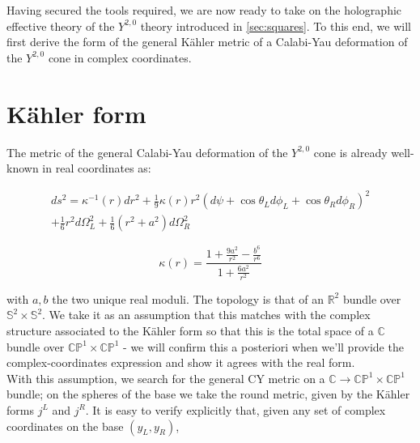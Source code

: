 %
%
%
\graphicspath{{images/}}
%

\label{chap:y20}

%

Having secured the tools required, we are now ready to take on the holographic effective theory of the $Y^{2,0}$ theory introduced in \ref{sec:squares}. To this end, we will first derive the form of the general K\"ahler metric of a Calabi-Yau deformation of the $Y^{2,0}$ cone in complex coordinates.

\section{K\"ahler form}

The metric of the general Calabi-Yau deformation of the $Y^{2,0}$ cone is already well-known in real coordinates as:

\begin{multline}
ds^2 = \kappa^{-1}(r)dr^2 + \frac{1}{9} \kappa(r) r^2 \left(d\psi + \cos\theta_L d\phi_L + \cos\theta_R d\phi_R\right)^2\\
+ \frac{1}{6} r^2 d\Omega_L^2 + \frac{1}{6}(r^2+a^2) d\Omega_R^2 \label{y20metric} 
\end{multline}

\begin{equation}
	\kappa(r) = \frac{1 + \frac{9a^2}{r^2} - \frac{b^6}{r^6}}{1+ \frac{6a^2}{r^2}}
\end{equation}

with $a,b$ the two unique real moduli. The topology is that of an $\mathbb{R}^2$ bundle over $\mathbb{S}^2 \times \mathbb{S}^2$. We take it as an assumption that this matches with the complex structure associated to the K\"ahler form so that this is the total space of a $\mathbb{C}$ bundle over $\mathbb{CP}^1 \times \mathbb{CP}^1$ - we will confirm this a posteriori when we'll provide the complex-coordinates expression and show it agrees with the real form.\\

With this assumption, we search for the general CY metric on a $\mathbb{C} \rightarrow \mathbb{CP}^1 \times \mathbb{CP}^1$ bundle; on the spheres of the base we take the round metric, given by the K\"ahler forms $j^L$ and $j^R$. It is easy to verify explicitly that, given any set of complex coordinates on the base $(y_L,y_R)$,

